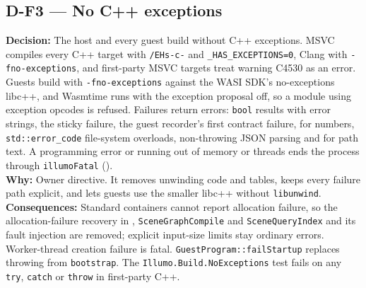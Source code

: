 \subsection*{D-F3 --- No C++ exceptions}
\begin{decisionbox}[title={D-F3 \quad 2026-09-29}]
\textbf{Decision:} The host and every guest build without C++ exceptions.
MSVC compiles every C++ target with \texttt{/EHs-c-} and
\texttt{\_HAS\_EXCEPTIONS=0}, Clang with \texttt{-fno-exceptions}, and
first-party MSVC targets treat warning C4530 as an error. Guests build with
\texttt{-fno-exceptions} against the WASI SDK's no-exceptions libc++, and
Wasmtime runs with the exception proposal off, so a module using exception
opcodes is refused. Failures return errors: \texttt{bool} results with
error strings, the sticky  failure, the guest
recorder's first contract failure,  for
numbers, \texttt{std::error\_code} file-system overloads, non-throwing JSON
parsing and  for path text. A programming error
or running out of memory or threads ends the process through
\texttt{illumoFatal} ().\\
\textbf{Why:} Owner directive. It removes unwinding code and tables, keeps
every failure path explicit, and lets guests use the smaller libc++ without
\texttt{libunwind}.\\
\textbf{Consequences:} Standard containers cannot report allocation failure,
so the allocation-failure recovery in ,
\texttt{SceneGraphCompile} and \texttt{SceneQueryIndex} and its fault
injection are removed; explicit input-size limits stay ordinary errors.
Worker-thread creation failure is fatal. \texttt{GuestProgram::failStartup}
replaces throwing from \texttt{bootstrap}. The
\texttt{Illumo.Build.NoExceptions} test fails on any \texttt{try},
\texttt{catch} or \texttt{throw} in first-party C++.
\end{decisionbox}

